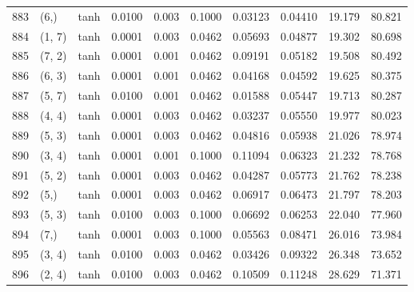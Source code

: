 \begin{tabular}{lllrrrrrrr}
883 &        (6,) &      tanh &  0.0100 &  0.003 &  0.1000 &          0.03123 &    0.04410 &      19.179 &    80.821 \\
884 &      (1, 7) &      tanh &  0.0001 &  0.003 &  0.0462 &          0.05693 &    0.04877 &      19.302 &    80.698 \\
885 &      (7, 2) &      tanh &  0.0001 &  0.001 &  0.0462 &          0.09191 &    0.05182 &      19.508 &    80.492 \\
886 &      (6, 3) &      tanh &  0.0001 &  0.001 &  0.0462 &          0.04168 &    0.04592 &      19.625 &    80.375 \\
887 &      (5, 7) &      tanh &  0.0100 &  0.001 &  0.0462 &          0.01588 &    0.05447 &      19.713 &    80.287 \\
888 &      (4, 4) &      tanh &  0.0001 &  0.003 &  0.0462 &          0.03237 &    0.05550 &      19.977 &    80.023 \\
889 &      (5, 3) &      tanh &  0.0001 &  0.003 &  0.0462 &          0.04816 &    0.05938 &      21.026 &    78.974 \\
890 &      (3, 4) &      tanh &  0.0001 &  0.001 &  0.1000 &          0.11094 &    0.06323 &      21.232 &    78.768 \\
891 &      (5, 2) &      tanh &  0.0001 &  0.003 &  0.0462 &          0.04287 &    0.05773 &      21.762 &    78.238 \\
892 &        (5,) &      tanh &  0.0001 &  0.003 &  0.0462 &          0.06917 &    0.06473 &      21.797 &    78.203 \\
893 &      (5, 3) &      tanh &  0.0100 &  0.003 &  0.1000 &          0.06692 &    0.06253 &      22.040 &    77.960 \\
894 &        (7,) &      tanh &  0.0001 &  0.003 &  0.1000 &          0.05563 &    0.08471 &      26.016 &    73.984 \\
895 &      (3, 4) &      tanh &  0.0100 &  0.003 &  0.0462 &          0.03426 &    0.09322 &      26.348 &    73.652 \\
896 &      (2, 4) &      tanh &  0.0100 &  0.003 &  0.0462 &          0.10509 &    0.11248 &      28.629 &    71.371 \\
\bottomrule
\end{tabular}
